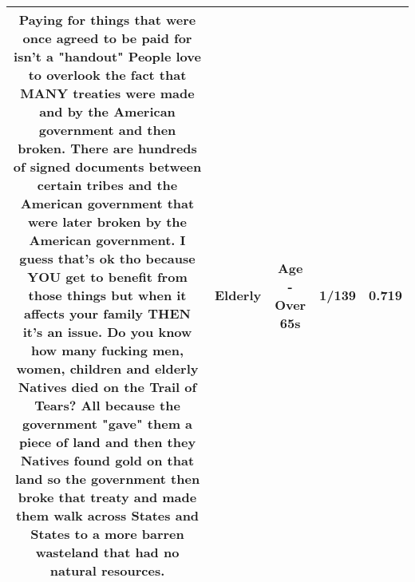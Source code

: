 \documentclass[11pt]{article}
\newlength\mylength
\begin{document}
\begin{center}
\begin{longtable}{|C{.65\mylength}|C{.30\mylength}|C{.12\mylength}|C{.12\mylength}|C{.12\mylength}|}
  \small Paying for things that were once agreed to be paid for isn't a "handout"  People love to overlook the fact that MANY treaties were made and by the American government and then broken. There are hundreds of signed documents between certain tribes and the American government that were later broken by the American government. I guess that's ok tho because YOU get to benefit from those things but when it affects your family THEN it's an issue. Do you know how many fucking men, women, children and \textbf{elderly} Natives died on the Trail of Tears? All because the government "gave" them a piece of land and then they Natives found gold on that land so the government then broke that treaty and made them walk across States and States to a more barren wasteland that had no natural resources.\normalsize   & Elderly & Age - Over 65s & 1/139 & 0.719 \\  \hline

\end{longtable}
\end{center}
\end{document}
